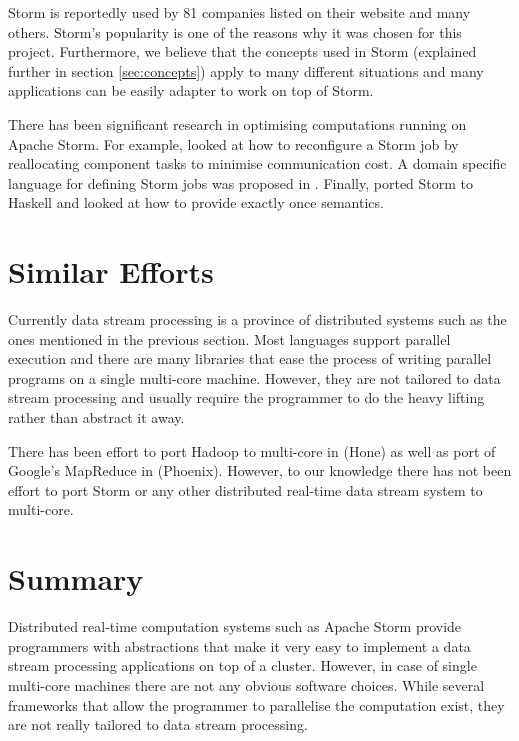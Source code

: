 \documentclass[bsc,logo,frontabs,twoside,singlespacing,normalheadings,parskip]{infthesis}\usepackage[]{graphicx}\usepackage[]{color}
\begin{document}
Storm is reportedly used by 81 companies listed on their website \cite{PoweredBy} and many others. Storm's popularity is one of the reasons why it was chosen for this project. Furthermore, we believe that the concepts used in Storm (explained further in section \ref{sec:concepts}) apply to many different situations and many applications can be easily adapter to work on top of Storm.

There has been significant research in optimising computations running on Apache Storm. For example, \cite{Chatzistergiou:2014:FHN:2661829.2661882} looked at how to reconfigure a Storm job by reallocating component tasks to minimise communication cost. A domain specific language for defining Storm jobs was proposed in \cite{DBLP:conf/fedcsis/ChandrasekaranSA14}. Finally, \cite{dimsonhailstorm} ported Storm to Haskell and looked at how to provide exactly once semantics.

\section{Similar Efforts}
\label{sec:similar_efforts}

Currently data stream processing is a province of distributed systems such as the ones mentioned in the previous section. Most languages support parallel execution and there are many libraries that ease the process of writing parallel programs on a single multi-core machine. However, they are not tailored to data stream processing and usually require the programmer to do the heavy lifting rather than abstract it away.

There has been effort to port Hadoop to multi-core in \citep{Kumar:2013:HSD:2536274.2536314} (Hone) as well as port of Google's MapReduce in \citep{ranger2007evaluating} (Phoenix). However, to our knowledge there has not been effort to port Storm or any other distributed real-time data stream system to multi-core.

\section{Summary}

Distributed real-time computation systems such as Apache Storm provide programmers with abstractions that make it very easy to implement a data stream processing applications on top of  a cluster. However, in case of single multi-core machines there are not any obvious software choices. While several frameworks that allow the programmer to parallelise the computation exist, they are not really tailored to data stream processing.
\end{document}
